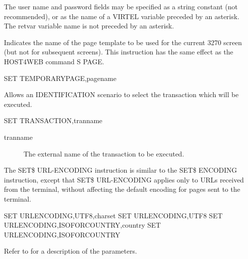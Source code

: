 \documentclass[letterpaper,10pt,english]{sphinxmanual}
\begin{document}
The user name and password fields may be specified as a string constant (not recommended), or as the name of a VIRTEL variable preceded by an asterisk. The retvar variable name is not preceded by an asterisk.


Indicates the name of the page template to be used for the current 3270 screen (but not for subsequent screens). This instruction has the same effect as the HOST4WEB command S PAGE.

\begin{sphinxVerbatim}[commandchars=\\\{\}]
SET\PYGZdl{} TEMPORARY\PYGZhy{}PAGE,\PYGZsq{}pagename\PYGZsq{}
\end{sphinxVerbatim}


Allows an IDENTIFICATION scenario to select the transaction which will be executed.

\begin{sphinxVerbatim}[commandchars=\\\{\}]
SET\PYGZdl{} TRANSACTION,\PYGZsq{}tranname\PYGZsq{}
\end{sphinxVerbatim}
\begin{description}
\item[{tranname}] \leavevmode
The external name of the transaction to be executed.

\end{description}
\label{\detokenize{User_Guide:v457ug-set-url-encoding}}

The SET\$ URL-ENCODING instruction is similar to the SET\$ ENCODING instruction, except that SET\$ URL-ENCODING
applies only to URLs received from the terminal, without affecting the default encoding for pages sent to the terminal.

\begin{sphinxVerbatim}[commandchars=\\\{\}]
SET\PYGZdl{} URL\PYGZhy{}ENCODING,UTF\PYGZhy{}8,\PYGZsq{}charset\PYGZsq{}
SET\PYGZdl{} URL\PYGZhy{}ENCODING,UTF\PYGZhy{}8
SET\PYGZdl{} URL\PYGZhy{}ENCODING,ISO\PYGZhy{}FOR\PYGZhy{}COUNTRY,\PYGZsq{}country\PYGZsq{}
SET\PYGZdl{} URL\PYGZhy{}ENCODING,ISO\PYGZhy{}FOR\PYGZhy{}COUNTRY
\end{sphinxVerbatim}

Refer to {\hyperref[\detokenize{User_Guide:v457ug-set-encoding}]{}} for a description of the parameters.
\end{document}
